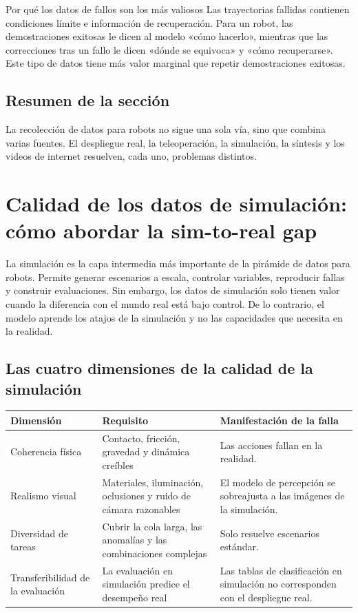 \documentclass[a4paper]{article}
\begin{document}
\begin{knowledgebox}{Por qué los datos de fallos son los más valiosos}
Las trayectorias fallidas contienen condiciones límite e información de recuperación. Para un robot, las demostraciones exitosas le dicen al modelo «cómo hacerlo», mientras que las correcciones tras un fallo le dicen «dónde se equivoca» y «cómo recuperarse». Este tipo de datos tiene más valor marginal que repetir demostraciones exitosas.
\end{knowledgebox}

\subsection{Resumen de la sección}

La recolección de datos para robots no sigue una sola vía, sino que combina varias fuentes. El despliegue real, la teleoperación, la simulación, la síntesis y los videos de internet resuelven, cada uno, problemas distintos.
\section{Calidad de los datos de simulación: cómo abordar la sim-to-real gap}

La simulación es la capa intermedia más importante de la pirámide de datos para robots. Permite generar escenarios a escala, controlar variables, reproducir fallas y construir evaluaciones. Sin embargo, los datos de simulación solo tienen valor cuando la diferencia con el mundo real está bajo control. De lo contrario, el modelo aprende los atajos de la simulación y no las capacidades que necesita en la realidad.

\subsection{Las cuatro dimensiones de la calidad de la simulación}

\noindent\begin{tabularx}{\textwidth}{p{}p{}X}
\toprule
Dimensión & Requisito & Manifestación de la falla \\
\midrule
Coherencia física & Contacto, fricción, gravedad y dinámica creíbles & Las acciones fallan en la realidad. \\
Realismo visual & Materiales, iluminación, oclusiones y ruido de cámara razonables & El modelo de percepción se sobreajusta a las imágenes de la simulación. \\
Diversidad de tareas & Cubrir la cola larga, las anomalías y las combinaciones complejas & Solo resuelve escenarios estándar. \\
Transferibilidad de la evaluación & La evaluación en simulación predice el desempeño real & Las tablas de clasificación en simulación no corresponden con el despliegue real. \\
\bottomrule
\end{tabularx}
\end{document}
